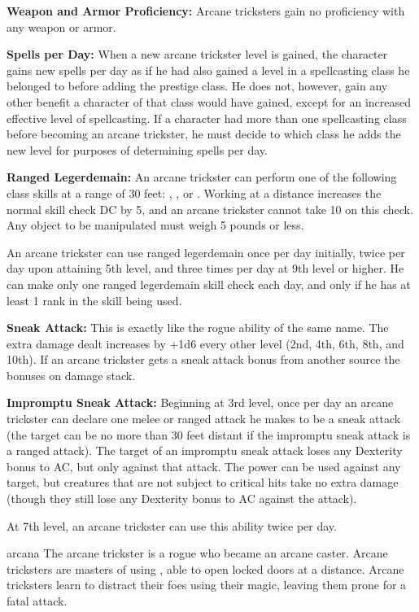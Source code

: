 {
\textbf{Weapon and Armor Proficiency:} Arcane tricksters gain no proficiency with any weapon or armor.

\textbf{Spells per Day:} When a new arcane trickster level is gained, the character gains new spells per day as if he had also gained a level in a spellcasting class he belonged to before adding the prestige class. He does not, however, gain any other benefit a character of that class would have gained, except for an increased effective level of spellcasting. If a character had more than one spellcasting class before becoming an arcane trickster, he must decide to which class he adds the new level for purposes of determining spells per day.

\textbf{Ranged Legerdemain:} An arcane trickster can perform one of the following class skills at a range of 30 feet: , , or . Working at a distance increases the normal skill check DC by 5, and an arcane trickster cannot take 10 on this check. Any object to be manipulated must weigh 5 pounds or less.

An arcane trickster can use ranged legerdemain once per day initially, twice per day upon attaining 5th level, and three times per day at 9th level or higher. He can make only one ranged legerdemain skill check each day, and only if he has at least 1 rank in the skill being used.

\textbf{Sneak Attack:} This is exactly like the rogue ability of the same name. The extra damage dealt increases by +1d6 every other level (2nd, 4th, 6th, 8th, and 10th). If an arcane trickster gets a sneak attack bonus from another source the bonuses on damage stack.

\textbf{Impromptu Sneak Attack:} Beginning at 3rd level, once per day an arcane trickster can declare one melee or ranged attack he makes to be a sneak attack (the target can be no more than 30 feet distant if the impromptu sneak attack is a ranged attack). The target of an impromptu sneak attack loses any Dexterity bonus to AC, but only against that attack. The power can be used against any target, but creatures that are not subject to critical hits take no extra damage (though they still lose any Dexterity bonus to AC against the attack).

At 7th level, an arcane trickster can use this ability twice per day.
}
{}
{arcana}
{The arcane trickster is a rogue who became an arcane caster.}
{Arcane tricksters are masters of using , able to open locked doors at a distance.}
{Arcane tricksters learn to distract their foes using their magic, leaving them prone for a fatal attack.}